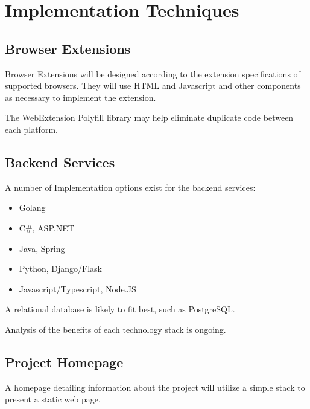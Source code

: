 \documentclass[proposal.tex]{subfiles}
\begin{document}
    
\section{Implementation Techniques}

\subsection{Browser Extensions}

Browser Extensions will be designed according to the extension specifications of supported browsers. They will use HTML and Javascript and other components as necessary to implement the extension. 

The WebExtension Polyfill library may help eliminate duplicate code between each platform.


\subsection{Backend Services}

A number of Implementation options exist for the backend services:

\begin{itemize}
    \item Golang 
    \item C\#, ASP.NET
    \item Java, Spring
    \item Python, Django/Flask
    \item Javascript/Typescript, Node.JS
\end{itemize}

A relational database is likely to fit best, such as PostgreSQL.

Analysis of the benefits of each technology stack is ongoing.


\subsection{Project Homepage}

A homepage detailing information about the project will utilize a simple stack to present a static web page.
\end{document}
